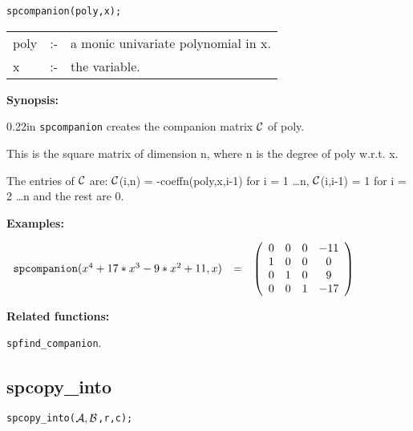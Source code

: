 \hspace*{0.175in} {\tt spcompanion(poly,x);}

\hspace*{0.1in} 
\begin{tabular}{l l l}
poly &:-& a monic univariate polynomial in x. \\
x    &:-& the variable.
\end{tabular}

{\bf Synopsis:}

\begin{addtolength}{\leftskip}{0.22in}
                {\tt spcompanion} creates the companion matrix ${\cal C}$
                of poly. 

This is the square matrix of dimension n, where n is the degree of poly 
w.r.t. x.

The entries of ${\cal C}$ are: 
                ${\cal C}$(i,n) = -coeffn(poly,x,i-1) for i = 1 
                \ldots n, ${\cal C}$(i,i-1) = 1 for i = 2 \ldots n and 
                the rest are 0.

\end{addtolength}


{\bf Examples:}

\begin{flushleft}  
\hspace*{0.1in}
\begin{math}  
\begin{array}{ccc}
{\tt spcompanion}(x^4+17*x^3-9*x^2+11,x) & = & 
\left( \begin{array}{cccc} 0 & 0 & 0 & -11 \\ 1 & 0 & 0 & 0 \\ 
0 & 1 & 0 & 9 \\ 0 & 0 & 1 & -17 
\end{array} \right)
\end{array}
\end{math}  
\end{flushleft}

{\bf Related functions:}

\hspace*{0.175in} {\tt spfind\_companion}.


\subsection{spcopy\_into}

\hspace*{0.175in} {\tt spcopy\_into(${\cal A,B}$,r,c);}

